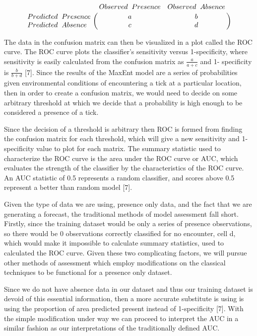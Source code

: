 \begin{equation} \bordermatrix{~ & Observed \hspace{0.2cm} Presence & Observed \hspace{0.2cm} Absence \cr
                  Predicted\hspace{0.2cm}  Presence & a & b \cr
                  Predicted \hspace{0.2cm} Absence & c & d \cr} \end{equation}
                  
\noindent The data in the confusion matrix can then be visualized in a plot called the ROC curve. The ROC curve plots the classifier's sensitivity versus 1-specificity, where sensitivity is easily calculated from the confusion matrix as  $\frac{a}{a+c}$ and 1- specificity is $\frac{b}{b+d}$ [7]. Since the results of the MaxEnt model are a series of probabilities given environmental conditions of encountering a tick at a particular location, then in order to create a confusion matrix, we would need to decide on some arbitrary threshold at which we decide that a probability is high enough to be considered a presence of a tick. \newline

\noindent Since the decision of a threshold is arbitrary then ROC is formed from finding the confusion matrix for each threshold, which will give a new sensitivity and 1-specificity value to plot for each matrix. The summary statistic used to characterize the ROC curve is the area under the ROC curve or AUC, which evaluates the strength of the classifier by the characteristics of the ROC curve. An AUC statistic of 0.5 represents a random classifier, and scores above 0.5 represent a better than random model [7].    \newline

\noindent Given the type of data we are using, presence only data, and the fact that we are generating a forecast, the traditional methods of model assessment fall short. Firstly, since the training dataset would be only a series of presence observations, so there would be 0 observations correctly classified for no encounter, cell d,  which would make it impossible to calculate summary statistics, used to calculated the ROC curve. Given these two complicating factors, we will pursue other methods of assessment which employ modifications on the classical techniques to be functional for a presence only dataset.  \newline

\noindent Since we do not have absence data in our dataset and thus our training dataset is devoid of this essential information, then a more accurate substitute is using is using the proportion of area predicted present instead of 1-specificity [7]. With the simple modification under way we can proceed to interpret the AUC in a similar fashion as our interpretations of the traditionally defined AUC.  \newline

